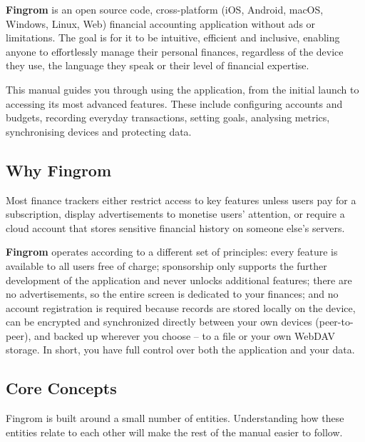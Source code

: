 
\noindent \textbf{Fingrom} is an open source code, cross-platform (iOS, Android, macOS,
Windows, Linux, Web) financial accounting application without ads or limitations. The goal is
for it to be intuitive, efficient and inclusive, enabling anyone to effortlessly manage their
personal finances, regardless of the device they use, the language they speak or their level
of financial expertise.

This manual guides you through using the application, from the initial launch to accessing
its most advanced features. These include configuring accounts and budgets, recording
everyday transactions, setting goals, analysing metrics, synchronising devices and
protecting data.


\subsection*{Why Fingrom}

Most finance trackers either restrict access to key features unless users pay for a
subscription, display advertisements to monetise users' attention, or require a cloud account
that stores sensitive financial history on someone else's servers.

\textbf{Fingrom} operates according to a different set of principles: every feature is
available to all users free of charge; sponsorship only supports the further development
of the application and never unlocks additional features; there are no advertisements, so
the entire screen is dedicated to your finances; and no account registration is required
because records are stored locally on the device, can be encrypted and synchronized directly
between your own devices (peer-to-peer), and backed up wherever you choose -- to a file or
your own WebDAV storage. In short, you have full control over both the application and your
data.


\subsection*{Core Concepts}

Fingrom is built around a small number of entities. Understanding how these entities relate
to each other will make the rest of the manual easier to follow.

